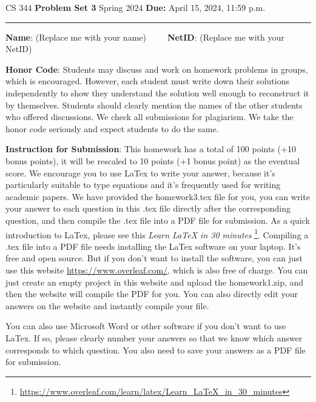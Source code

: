 \documentclass[12pt]{article}
\begin{document}
\noindent
CS 344 \hfill \textbf{Problem Set 3} \newline 
{Spring 2024} \hfill \textbf{Due:} April 15, 2024, 11:59 p.m.

\noindent
\rule{\linewidth}{0.4pt}
\vspace{.4cm}

\textbf{Name}: ({\color{blue}Replace me with your name})~~~~~\textbf{NetID}: ({\color{blue}Replace me with your NetID})

\vspace{.5cm}

\textbf{Honor Code}: Students may discuss and work on homework problems in groups, which is encouraged. However, each student must write down their solutions independently to show they understand the solution well enough to reconstruct it by themselves.  Students should clearly mention the names of the other students who offered discussions. We check all submissions for plagiarism. We take the honor code seriously and expect students to do the same.


\vspace{.5cm}

\textbf{Instruction for Submission}: This homework has a total of 100 points (+10 bonus points), it will be rescaled to 10 points (+1 bonus point) as the eventual score. We encourage you to use LaTex to write your answer, because it's particularly suitable to type equations and it's frequently used for writing academic papers. We have provided the homework3.tex file for you, you can write your answer to each question in this .tex file directly after the corresponding question, and then compile the .tex file into a PDF file for submission. As a quick introduction to LaTex, please see this \textit{Learn LaTeX in 30 minutes} \footnote{\url{https://www.overleaf.com/learn/latex/Learn_LaTeX_in_30_minutes}}. Compiling a .tex file into a PDF file needs installing the LaTex software on your laptop. It's free and open source. But if you don't want to install the software, you can just use this website \url{https://www.overleaf.com/}, which is also free of charge. You can just create an empty project in this website and upload the homework1.zip, and then the website will compile the PDF for you. You can also directly edit your answers on the website and instantly compile your file.

You can also use Microsoft Word or other software if you don't want to use LaTex. If so, please clearly number your answers so that we know which answer corresponds to which question. You also need to save your answers as a PDF file for submission.
\end{document}
